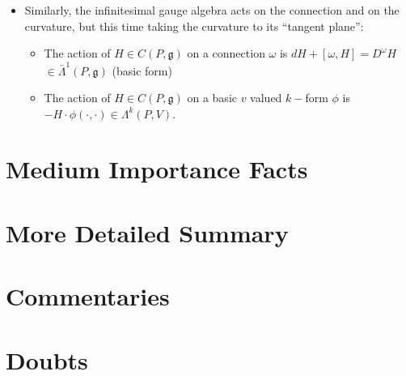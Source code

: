 \documentclass[12pt]{report}
\begin{document}
\begin{itemize}
    \item Similarly, the infinitesimal gauge algebra acts on the connection and on the curvature, but this time taking the curvature to its ``tangent plane'': 
    \begin{itemize}
        \item The action of $H \in C(P, \mathfrak g)$ on a connection $\omega$ is $dH + [\omega, H] = D^\omega H$ $\in \bar \Lambda^1(P, \mathfrak g)$ (basic form)
        
        \item The action of $H \in C(P, \mathfrak g)$ on a basic $v$ valued $k-$form $\phi$ is $-H \cdot \phi(\cdot, \cdot) \in \Lambda^k(P, V)$.
    \end{itemize}
\end{itemize}

\section{Medium Importance Facts}

\section{More Detailed Summary}

\section{Commentaries}

\section{Doubts}
\end{document}
